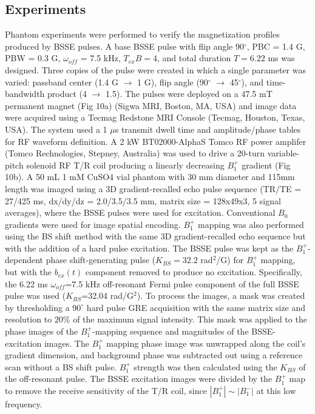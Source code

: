 \documentclass{article}
\newcommand{\bext}{b_{ex}(t)}
\begin{document}
\subsection{Experiments}
Phantom experiments were performed to verify the magnetization profiles produced by BSSE pulses. 
A base BSSE pulse with flip angle 90$^\circ$, PBC = 1.4 G, PBW = 0.3 G, 
$\omega_{off}$ = 7.5 kHz, $T_{ex}B=4$, 
and total duration $T=6.22$ ms was designed. 
Three copies of the pulse were created in which a single parameter was varied: 
passband center (1.4 G $\rightarrow$ 1 G), 
flip angle (90$^\circ$ $\rightarrow$ 45$^\circ$), 
and time-bandwidth product (4 $\rightarrow$ 1.5). 
The pulses were deployed on a 47.5 mT permanent magnet (Fig 10a) (Sigwa MRI, Boston, MA, USA) and image data were 
acquired using a Tecmag Redstone MRI Console (Tecmag, Houston, Texas, USA). 
The system used a 1 $\mu$s transmit dwell time 
and amplitude/phase tables for RF waveform definition.
A 2 kW BT02000-AlphaS Tomco RF power amplifer (Tomco Rechnologies, Stepney, Australia) was used to drive a 20-turn variable-pitch solenoid RF T/R coil producing a linearly decreasing $B_1^+$ gradient (Fig 10b). 
A 50 mL 1 mM CuSO4 vial phantom with 30 mm diameter and 115mm length was imaged using a 3D gradient-recalled echo pulse sequence (TR/TE = 27/425 ms, dx/dy/dz = 2.0/3.5/3.5 mm, matrix size = 128x49x3, 5 signal averages),
where the BSSE pulses were used for excitation. 
Conventional $B_0$ gradients were used for image spatial encoding. 
$B_1^+$ mapping was also performed using the BS shift method \cite{Sacolick2010B1Shift}
with the same 3D gradient-recalled echo sequence but 
with the addition of a hard pulse excitation. 
The BSSE pulse was kept as the $B_1^+$-dependent phase shift-generating pulse ($K_{BS}=32.2$ rad$^2$/G) 
for $B_1^+$ mapping, 
but with the $\bext$ component removed to produce no excitation.
Specifically,  
the 6.22 ms $\omega_{off}$=7.5 kHz off-resonant Fermi pulse component of the full BSSE pulse was used ($K_{BS}$=32.04 rad/G$^2$). 
To process the images, a mask was created by thresholding a $90^\circ$ hard pulse GRE acquisition with the same matrix size and resolution to $20\%$ of the maximum signal intensity. 
This mask was applied to the phase images of the $B_1^+$-mapping sequence and magnitudes of the BSSE-excitation images. 
The $B_1^+$ mapping phase image was unwrapped along the coil's gradient dimension, 
and background phase was subtracted out using a reference scan without a BS shift pulse. 
$B_1^+$ strength was then calculated using the $K_{BS}$ of the off-resonant pulse. 
The BSSE excitation images were divided by the $B_1^+$ map to remove the receive sensitivity of the T/R coil,
since $|B_1^+| \sim |B_1^-|$ at this low frequency.
\end{document}
